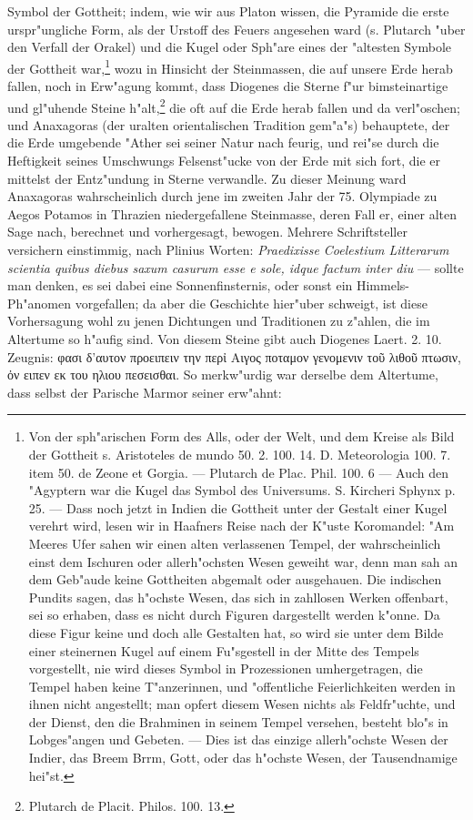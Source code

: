 \documentclass[a4paper, 11pt, oneside, polutonikogreek, german]{article}
\begin{document}
Symbol der Gottheit; indem, wie wir aus Platon wissen, die Pyramide die erste urspr"ungliche Form, als der Urstoff des Feuers angesehen ward (s. Plutarch "uber den Verfall der Orakel) und die Kugel oder Sph"are eines der "altesten Symbole der Gottheit war,\footnote{Von der sph"arischen Form des Alls, oder der Welt, und dem Kreise als Bild der Gottheit s. Aristoteles de mundo 50. 2. 100. 14. D. Meteorologia 100. 7. item 50. de Zeone et Gorgia. --- Plutarch de Plac. Phil. 100. 6 --- Auch den "Agyptern war die Kugel das Symbol des Universums. S. Kircheri Sphynx p. 25. --- Dass noch jetzt in Indien die Gottheit unter der Gestalt einer Kugel verehrt wird, lesen wir in Haafners Reise nach der K"uste Koromandel:
\hspace*{0.5cm} "Am Meeres Ufer sahen wir einen alten verlassenen Tempel, der wahrscheinlich einst dem Ischuren oder allerh"ochsten Wesen geweiht war, denn man sah an dem Geb"aude keine Gottheiten abgemalt oder ausgehauen. Die indischen Pundits sagen, das h"ochste Wesen, das sich in zahllosen Werken offenbart, sei so erhaben, dass es nicht durch Figuren dargestellt werden k"onne. Da diese Figur keine und doch alle Gestalten hat, so wird sie unter dem Bilde einer steinernen Kugel auf einem Fu"sgestell in der Mitte des Tempels vorgestellt, nie wird dieses Symbol in Prozessionen umhergetragen, die Tempel haben keine T"anzerinnen, und "offentliche Feierlichkeiten werden in ihnen nicht angestellt; man opfert diesem Wesen nichts als Feldfr"uchte, und der Dienst, den die Brahminen in seinem Tempel versehen, besteht blo"s in Lobges"angen und Gebeten. --- Dies ist das einzige allerh"ochste Wesen der Indier, das Breem Brrm, Gott, oder das h"ochste Wesen, der Tausendnamige hei"st.} wozu in Hinsicht der Steinmassen, die auf unsere Erde herab fallen, noch in Erw"agung kommt, dass Diogenes die Sterne f"ur bimsteinartige und gl"uhende Steine h"alt,\footnote{Plutarch de Placit. Philos. 100. 13.} die oft auf die Erde herab fallen und da verl"oschen; und Anaxagoras (der uralten orientalischen Tradition gem"a"s) behauptete, der die Erde umgebende "Ather sei seiner Natur nach feurig, und rei"se durch die Heftigkeit seines Umschwungs Felsenst"ucke von der Erde mit sich fort, die er mittelst der Entz"undung in Sterne verwandle. Zu dieser Meinung ward Anaxagoras wahrscheinlich durch jene im zweiten Jahr der 75. Olympiade zu Aegos Potamos in Thrazien niedergefallene Steinmasse, deren Fall er, einer alten Sage nach, berechnet und vorhergesagt, bewogen. Mehrere Schriftsteller versichern einstimmig, nach Plinius Worten: \emph{Praedixisse Coelestium Litterarum scientia quibus diebus saxum casurum esse e sole, idque factum inter diu} --- sollte man denken, es sei dabei eine Sonnenfinsternis, oder sonst ein Himmels-Ph"anomen vorgefallen; da aber die Geschichte hier"uber schweigt, ist diese Vorhersagung wohl zu jenen Dichtungen und Traditionen zu z"ahlen, die im Altertume so h"aufig sind. Von diesem Steine gibt auch Diogenes Laert. 2. 10. Zeugnis: φασι δ'αυτον προειπειν την περἰ Αιγος ποταμον γενομενιν τοῦ λιθοῦ πτωσιν, ὀν ειπεν εκ του ηλιου πεσεισθαι. So merkw"urdig war derselbe dem Altertume, dass selbst der Parische Marmor seiner erw"ahnt:
\end{document}
